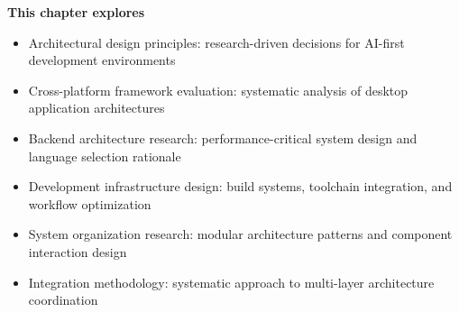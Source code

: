 \begin{tcolorbox}[
    enhanced,
    colback=white,
    colframe=brandTertiary!40,
    boxrule=1.5pt,
    arc=15pt,
    drop shadow={brandTertiary!25},
    left=1.5cm,
    right=1.5cm,
    top=1.2cm,
    bottom=1.2cm
]
\begin{center}
{\Large\textbf{\textcolor{brandTertiary}{This chapter explores}}}
\end{center}

\vspace{0.8cm}

\begin{itemize}[leftmargin=1.2cm, itemsep=0.4cm, label={\textcolor{brandTertiary}{$\blacktriangleright$}}]
    \item {\large Architectural design principles: research-driven decisions for AI-first development environments}
    \item {\large Cross-platform framework evaluation: systematic analysis of desktop application architectures}
    \item {\large Backend architecture research: performance-critical system design and language selection rationale}
    \item {\large Development infrastructure design: build systems, toolchain integration, and workflow optimization}
    \item {\large System organization research: modular architecture patterns and component interaction design}
    \item {\large Integration methodology: systematic approach to multi-layer architecture coordination}
\end{itemize}
\end{tcolorbox}

\clearpage

